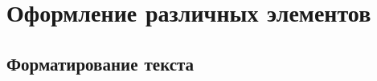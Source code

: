 \chapter{Оформление различных элементов}\label{ch:ch1}

\section{Форматирование текста}\label{sec:ch1/sec1}
